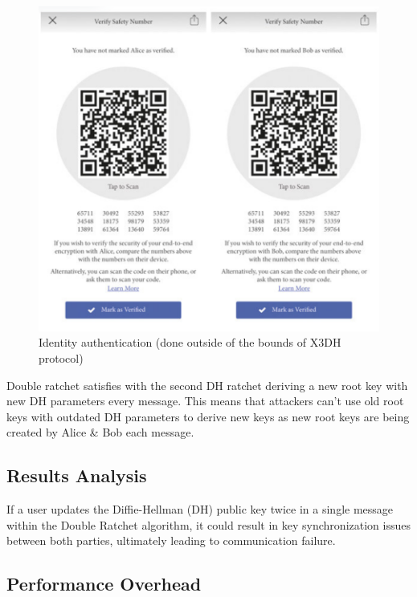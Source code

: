 \documentclass[11pt]{article}
\begin{document}
\begin{figure}[htbp]
    \centering
    \includegraphics[width=1\linewidth]{images/safety_numbers.png}
    \caption{Identity authentication (done outside of the bounds of X3DH protocol)}
    \label{fig:safety-numbers}
\end{figure}

Double ratchet satisfies with the second DH ratchet deriving a new root key with new DH parameters every message. This means that attackers can't use old root keys with outdated DH parameters to derive new keys as new root keys are being created by Alice \& Bob each message.

\subsection{Results Analysis}
If a user updates the Diffie-Hellman (DH) public key twice in a single message within the Double Ratchet algorithm, it could result in key synchronization issues between both parties, ultimately leading to communication failure.

\subsection{Performance Overhead}
\end{document}
